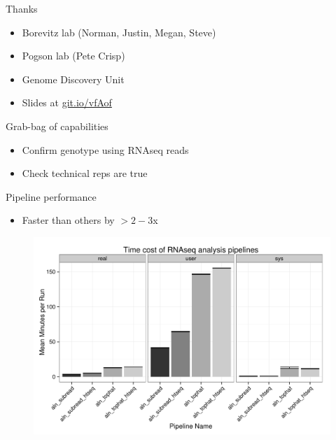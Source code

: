 \documentclass[t]{beamer}
\begin{document}
\begin{frame}{Thanks}
  \begin{itemize}
    \item Borevitz lab (Norman, Justin, Megan, Steve)
    \item Pogson lab (Pete Crisp)
    \item Genome Discovery Unit
    \vfill
    \item Slides at \url{git.io/vfAof}
  \end{itemize}
\end{frame}

\begin{frame}{Grab-bag of capabilities}
  \begin{itemize}
    \item Confirm genotype using RNAseq reads
    \item Check technical reps are true
  \end{itemize}
\end{frame}

\begin{frame}{Pipeline performance}
  \begin{itemize}
    \item Faster than others by $>2-3$x
  \end{itemize}
  \begin{figure}[h]
    \begin{center}
      \includegraphics[width=\textwidth]{img/pltimes.pdf}
    \end{center}
  \end{figure}
\end{frame}
\end{document}
